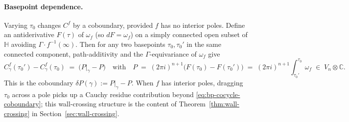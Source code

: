 \documentclass[11pt]{article}
\numberwithin{equation}{section}  %
\newcommand{\HH}{\mathbb{H}}
\newcommand{\CC}{\mathbb{C}}
\begin{document}
\paragraph{Basepoint dependence.}
Varying $\tau_0$ changes $C^f$ by a coboundary, provided $f$ has no
interior poles.  Define an antiderivative $F(\tau)$ of $\omega_f$ (so
$dF = \omega_f$) on a simply connected open subset of $\HH$ avoiding
$\Gamma\cdot f^{-1}(\infty)$.  Then for any two basepoints
$\tau_0, \tau_0'$ in the same connected component, path-additivity and the
$\Gamma$-equivariance of $\omega_f$ give
\begin{equation}\label{eq:bp-cocycle-coboundary}
  C^f_\gamma(\tau_0') - C^f_\gamma(\tau_0)
  \;=\; \bigl(P|_\gamma - P\bigr)
  \quad \text{with}\quad
  P \;=\; (2\pi i)^{n+1}\bigl(F(\tau_0) - F(\tau_0')\bigr)
  \;=\; (2\pi i)^{n+1}\!\int_{\tau_0'}^{\tau_0}\!\omega_f
  \;\in\; V_n\otimes\CC.
\end{equation}
This is the coboundary $\delta P(\gamma) := P|_\gamma - P$.  When $f$
has interior poles, dragging $\tau_0$ across a pole picks up a Cauchy
residue contribution beyond \eqref{eq:bp-cocycle-coboundary}; this
wall-crossing structure is the content of Theorem~\ref{thm:wall-crossing}
in Section~\ref{sec:wall-crossing}.



\end{document}
